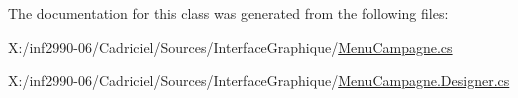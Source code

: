 The documentation for this class was generated from the following files\-:\begin{DoxyCompactItemize}
\item 
X\-:/inf2990-\/06/\-Cadriciel/\-Sources/\-Interface\-Graphique/\hyperlink{_menu_campagne_8cs}{Menu\-Campagne.\-cs}\item 
X\-:/inf2990-\/06/\-Cadriciel/\-Sources/\-Interface\-Graphique/\hyperlink{_menu_campagne_8_designer_8cs}{Menu\-Campagne.\-Designer.\-cs}\end{DoxyCompactItemize}
